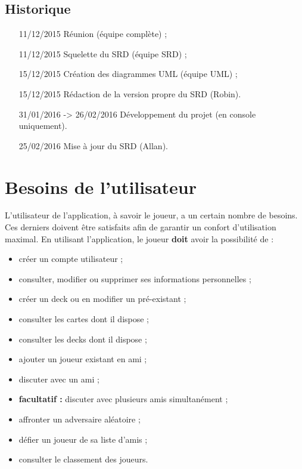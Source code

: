 \documentclass{article}
\begin{document}
	\subsection{Historique}
		\begin{itemize}
			\item[11/12/2015] Réunion (équipe complète) ;
			\item[11/12/2015] Squelette du SRD (équipe SRD) ;
			\item[15/12/2015] Création des diagrammes UML (équipe UML) ;
			\item[15/12/2015] Rédaction de la version propre du SRD (Robin).
			\item[31/01/2016] -> 26/02/2016 Développement du projet (en console uniquement).
			\item[25/02/2016]  Mise à jour du SRD (Allan).
		\end{itemize}

\newpage

\section{Besoins de l'utilisateur}
	L'utilisateur de l'application, à savoir le joueur, a un certain nombre de besoins. Ces derniers doivent être satisfaits afin de garantir un confort d'utilisation
	maximal. En utilisant l'application, le joueur \textbf{doit} avoir la possibilité de :

	\begin{itemize}
		\item créer un compte utilisateur ;
		\item consulter, modifier ou supprimer ses informations personnelles ; 
		\item créer un \gls{deck} ou en modifier un pré-existant ;
		\item consulter les cartes dont il dispose ;
		\item consulter les \glspl{deck} dont il dispose ;
		\item ajouter un joueur existant en ami ;
		\item discuter avec un ami ;
		\item \textbf{\gls{facultatif} :} discuter avec plusieurs amis simultanément ;
		\item affronter un adversaire aléatoire ;
		\item défier un joueur de sa liste d'amis ;
		\item consulter le classement des joueurs.
	\end{itemize}
\end{document}
